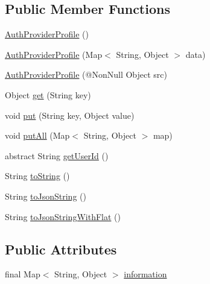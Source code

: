 \subsection*{Public Member Functions}
\begin{DoxyCompactItemize}
\item 
\hyperlink{classcom_1_1toast_1_1android_1_1gamebase_1_1base_1_1auth_1_1_auth_provider_profile_a252d4e6e5262d28f1e821f83b3584a8c}{Auth\+Provider\+Profile} ()
\item 
\hyperlink{classcom_1_1toast_1_1android_1_1gamebase_1_1base_1_1auth_1_1_auth_provider_profile_a993fed9ef05cec6de7e972e84b17820b}{Auth\+Provider\+Profile} (Map$<$ String, Object $>$ data)
\item 
\hyperlink{classcom_1_1toast_1_1android_1_1gamebase_1_1base_1_1auth_1_1_auth_provider_profile_a1c5fdaa251e51c6a42b1428dbcfb9205}{Auth\+Provider\+Profile} (@Non\+Null Object src)
\item 
Object \hyperlink{classcom_1_1toast_1_1android_1_1gamebase_1_1base_1_1auth_1_1_auth_provider_profile_a52ee53f651081be7a1457a7e4c8c2149}{get} (String key)
\item 
void \hyperlink{classcom_1_1toast_1_1android_1_1gamebase_1_1base_1_1auth_1_1_auth_provider_profile_a6eb563ccccdd77bf6fce2ef9f486944f}{put} (String key, Object value)
\item 
void \hyperlink{classcom_1_1toast_1_1android_1_1gamebase_1_1base_1_1auth_1_1_auth_provider_profile_a720237025269aa7234a6c8644c9bba52}{put\+All} (Map$<$ String, Object $>$ map)
\item 
abstract String \hyperlink{classcom_1_1toast_1_1android_1_1gamebase_1_1base_1_1auth_1_1_auth_provider_profile_aeb3992a68842457e35a05500f8282b24}{get\+User\+Id} ()
\item 
String \hyperlink{classcom_1_1toast_1_1android_1_1gamebase_1_1base_1_1auth_1_1_auth_provider_profile_ad146fa8579a5f8a876c4688cc5a68520}{to\+String} ()
\item 
String \hyperlink{classcom_1_1toast_1_1android_1_1gamebase_1_1base_1_1auth_1_1_auth_provider_profile_a58acf6402880e9769d79d8667581fa6a}{to\+Json\+String} ()
\item 
String \hyperlink{classcom_1_1toast_1_1android_1_1gamebase_1_1base_1_1auth_1_1_auth_provider_profile_a4b395d4feb39ee98fdf03a0a1773cca7}{to\+Json\+String\+With\+Flat} ()
\end{DoxyCompactItemize}
\subsection*{Public Attributes}
\begin{DoxyCompactItemize}
\item 
final Map$<$ String, Object $>$ \hyperlink{classcom_1_1toast_1_1android_1_1gamebase_1_1base_1_1auth_1_1_auth_provider_profile_ac199f333d26c29712c951ab5d7ea8efa}{information}
\end{DoxyCompactItemize}


